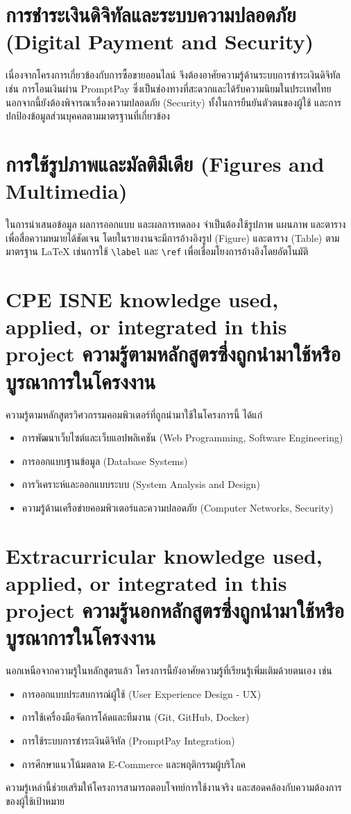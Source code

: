 \section{การชำระเงินดิจิทัลและระบบความปลอดภัย (Digital Payment and Security)}
เนื่องจากโครงการเกี่ยวข้องกับการซื้อขายออนไลน์ 
จึงต้องอาศัยความรู้ด้านระบบการชำระเงินดิจิทัล เช่น การโอนเงินผ่าน PromptPay \cite{promptpay2021} 
ซึ่งเป็นช่องทางที่สะดวกและได้รับความนิยมในประเทศไทย  
นอกจากนี้ยังต้องพิจารณาเรื่องความปลอดภัย (Security) \cite{pressman2014} 
ทั้งในการยืนยันตัวตนของผู้ใช้ และการปกป้องข้อมูลส่วนบุคคลตามมาตรฐานที่เกี่ยวข้อง

\section{การใช้รูปภาพและมัลติมีเดีย (Figures and Multimedia)}
ในการนำเสนอข้อมูล ผลการออกแบบ และผลการทดลอง \cite{pressman2014} 
จำเป็นต้องใช้รูปภาพ แผนภาพ และตาราง เพื่อสื่อความหมายได้ชัดเจน 
โดยในรายงานจะมีการอ้างอิงรูป (Figure) และตาราง (Table) ตามมาตรฐาน {\LaTeX} 
เช่นการใช้ \verb.\label. และ \verb.\ref. เพื่อเชื่อมโยงการอ้างอิงโดยอัตโนมัติ

\section{\ifenglish%
\ifcpe CPE \else ISNE \fi knowledge used, applied, or integrated in this project
\else%
ความรู้ตามหลักสูตรซึ่งถูกนำมาใช้หรือบูรณาการในโครงงาน
\fi
}
ความรู้ตามหลักสูตรวิศวกรรมคอมพิวเตอร์ที่ถูกนำมาใช้ในโครงการนี้ ได้แก่
\begin{itemize}
    \item การพัฒนาเว็บไซต์และเว็บแอปพลิเคชัน (Web Programming, Software Engineering) \cite{pressman2014}
    \item การออกแบบฐานข้อมูล (Database Systems)
    \item การวิเคราะห์และออกแบบระบบ (System Analysis and Design)
    \item ความรู้ด้านเครือข่ายคอมพิวเตอร์และความปลอดภัย (Computer Networks, Security) \cite{pressman2014}
\end{itemize}

\section{\ifenglish%
Extracurricular knowledge used, applied, or integrated in this project
\else%
ความรู้นอกหลักสูตรซึ่งถูกนำมาใช้หรือบูรณาการในโครงงาน
\fi
}
นอกเหนือจากความรู้ในหลักสูตรแล้ว โครงการนี้ยังอาศัยความรู้ที่เรียนรู้เพิ่มเติมด้วยตนเอง เช่น
\begin{itemize}
    \item การออกแบบประสบการณ์ผู้ใช้ (User Experience Design - UX) \cite{pressman2014}
    \item การใช้เครื่องมือจัดการโค้ดและทีมงาน (Git, GitHub, Docker)
    \item การใช้ระบบการชำระเงินดิจิทัล (PromptPay Integration) \cite{promptpay2021}
    \item การศึกษาแนวโน้มตลาด E-Commerce และพฤติกรรมผู้บริโภค \cite{otop2020}
\end{itemize}
ความรู้เหล่านี้ช่วยเสริมให้โครงการสามารถตอบโจทย์การใช้งานจริง 
และสอดคล้องกับความต้องการของผู้ใช้เป้าหมาย
